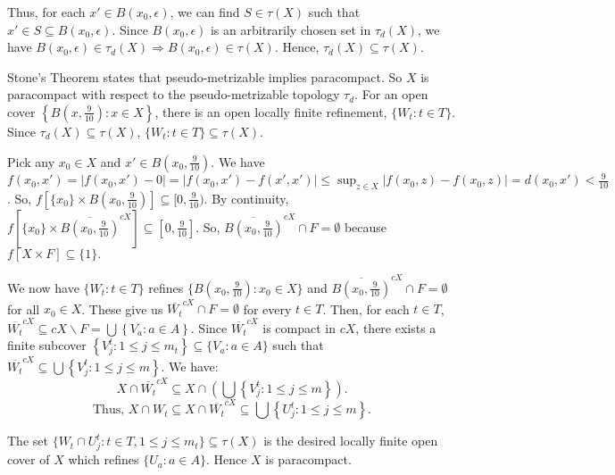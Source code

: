 \documentclass{article}
\begin{document}
\vskip 10pt


Thus, for each $x' \in B(x_0,\epsilon)$, we can find $S\in \tau(X)$ such that $x'\in S \subseteq B(x_0,\epsilon).$ Since $B(x_0, \epsilon)$ is an arbitrarily chosen set in 
$\tau_d(X)$, we have $B(x_0, \epsilon)\in \tau_d(X) \Rightarrow B(x_0,\epsilon) \in \tau(X)$. Hence, $\tau_d(X) \subseteq \tau(X)$.

\vskip 10pt


Stone's Theorem states that pseudo-metrizable implies paracompact. So $X$ is paracompact with respect to the pseudo-metrizable topology $\tau_d$. For an open cover $\left\{B(x,\frac{9}{10}): x\in X\right\}$, there is an open locally finite refinement, $\{W_t : t\in T\}.$ Since $\tau_d(X) \subseteq \tau(X)$, $\{W_t: t\in T\} \subseteq \tau(X)$. 


\vskip 10pt
Pick any $x_0\in X$ and $x' \in B(x_0,\frac{9}{10})$. We have $f(x_0, x')= |f(x_0,x')-0|=|f(x_0,x')-f(x',x')| \leq \sup_{z\in X}\left|f(x_0,z)-f(x_0,z)\right|= d(x_0,x') < \frac{9}{10}$. 
So, $f\left[\{x_0\} \times B(x_0, \frac{9}{10})\right] \subseteq [0,\frac{9}{10})$. By continuity, $f\left[\{x_0\}\times \overline{B(x_0,\frac{9}{10})}^{cX}\right] \subseteq [0,\frac{9}{10}].$ So, $\overline{B(x_0,\frac{9}{10})}^{cX} \cap F =\emptyset$ because $f\left[X\times F\right] \subseteq \{1\}.$

\vskip 15pt

We now have $\{W_t:  t\in T\}$ refines $\{B(x_0,\frac{9}{10}): x_0\in X\}$ and $\overline{B(x_0,\frac{9}{10})}^{cX} \cap F =\emptyset$ for all $x_0\in X$. These give us $\overline{W_t}^{cX} \cap F = \emptyset$ for every $t \in T$. Then, for each $t\in T$, 
$\overline{W_t}^{cX} \subseteq cX\backslash F = \bigcup \left\{V_a: a\in A\right\}$. Since $\overline{W_t}^{cX}$ is compact in $cX$, there exists a finite subcover $\left\{V_j^t: 1\leq j\leq m_t\right\} \subseteq \{V_a: a \in A\}$ such that $\overline{W_t}^{cX} \subseteq \bigcup \left\{V_j^t: 1\leq j \leq m \right\}$. We have: 
$$X\cap \overline{W_t}^{cX} \subseteq X\cap (\bigcup \left\{V_j^t: 1\leq j \leq m\right\}).$$
$$\mbox{Thus, }X\cap W_t \subseteq X\cap \overline{W_t}^{cX} \subseteq \bigcup \left\{U_j^t: 1\leq j\leq m\right\}.$$

\vskip 20pt

The set $\{W_t \cap U_j^t: t\in T, 1 \leq j \leq m_t \} \subseteq \tau(X)$ is the desired locally finite open cover of $X$ which refines $\{U_a: a \in A\}$. Hence $X$ is paracompact.
\end{document}

